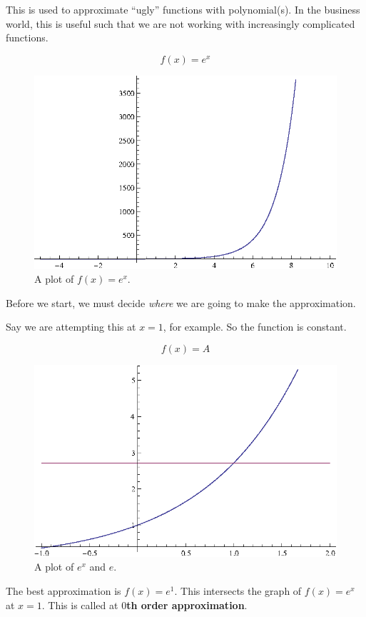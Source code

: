 This is used to approximate ``ugly'' functions with polynomial(s). In the
business world, this is useful such that we are not working with increasingly
complicated functions.

\begin{ex}
  \[ f(x) =  e^x \]
  \begin{figure}[H]
    \begin{center}
      \includegraphics{continuous/series/etx.eps}
    \end{center}
    \caption{A plot of $f(x)=e^x$.}
    \label{fig:etx}
  \end{figure}
  Before we start, we must decide \emph{where} we are going to make the
  approximation.

  Say we are attempting this at $x=1$, for example. So the function is constant.

  \[ f(x) = A \]
  \begin{figure}[H]
    \begin{center}
      \includegraphics{continuous/series/etx2.eps}
    \end{center}
    \caption{A plot of $e^x$ and $e$.}
    \label{fig:etx2}
  \end{figure}
  The best approximation is $f(x)=e^1$. This intersects the graph of $f(x)=e^x$
  at $x=1$. This is called at \textbf{$0$th order approximation}.


\end{ex}
